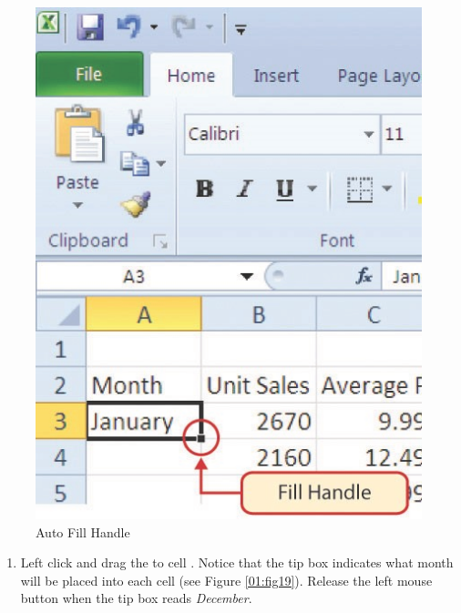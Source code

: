 \begin{figure}[H]
	\centering
	\includegraphics[width=\maxwidth{.95\linewidth}]{gfx/ch01_fig18}
	\caption{Auto Fill Handle}
	\label{01:fig18}
\end{figure}

\begin{enumerate}[resume]
	\item Left click and drag the  to cell . Notice that the  tip box indicates what month will be placed into each cell (see Figure \ref{01:fig19}). Release the left mouse button when the tip box reads \textit{December}.
\end{enumerate}


